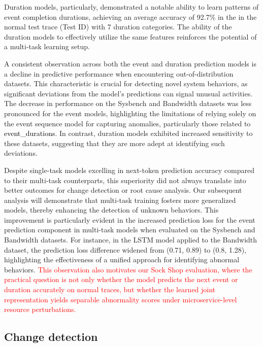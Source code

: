 \documentclass[preprint,12pt]{elsarticle}
\begin{document}
Duration models, particularly, demonstrated a notable ability to learn patterns of event completion durations, achieving an average accuracy of 92.7\% in the in the normal test trace (Test ID) with 7 duration categories. The ability of the duration models to effectively utilize the same features reinforces the potential of a multi-task learning setup.

A consistent observation across both the event and duration prediction models is a decline in predictive performance when encountering out-of-distribution datasets. This characteristic is crucial for detecting novel system behaviors, as significant deviations from the model's predictions can signal unusual activities. The decrease in performance on the Sysbench and Bandwidth datasets was less pronounced for the event models, highlighting the limitations of relying solely on the event sequence model for capturing anomalies, particularly those related to \textcolor{black}{event\_durations}. In contrast, duration models exhibited increased sensitivity to these datasets, suggesting that they are more adept at identifying such deviations.

Despite single-task models excelling in next-token prediction accuracy compared to their multi-task counterparts, this superiority did not always translate into better outcomes for change detection or root cause analysis. Our subsequent analysis will demonstrate that multi-task training fosters more generalized models, thereby enhancing the detection of unknown behaviors. This improvement is particularly evident in the increased prediction loss for the event prediction component in multi-task models when evaluated on the Sysbench and Bandwidth datasets. For instance, in the LSTM model applied to the Bandwidth dataset, the prediction loss difference widened from (0.71, 0.89) to (0.8, 1.28), highlighting the effectiveness of a unified approach for identifying abnormal behaviors. \textcolor{red}{This observation also motivates our Sock Shop evaluation, where the practical question is not only whether the model predicts the next event or duration accurately on normal traces, but whether the learned joint representation yields separable abnormality scores under microservice-level resource perturbations.}


\subsection{Change detection}
\end{document}
